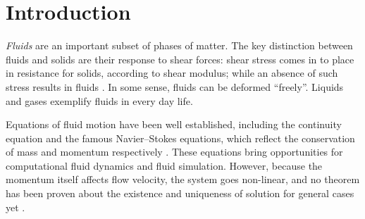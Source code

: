 \documentclass[english, nochinese]{pkupaper}
\title{\titlemark}
\author{\authoring}
\date{June 21, 2018}
\begin{document}
\maketitle

\begin{abstract}
Fluids, highly versatile, have both global structures and time-varying details. This results in difficulties for computation and modeling. In spite of such challenges, \emph{computational fluid dynamics} (CFD) has attracted attention since 20\textsuperscript{th} century, and lots of methodologies have been developed due to the huge number of applications of fluids in engineering. Among different kinds of computational fluid dynamics tasks, \emph{turbulent flows} are of high importance because of its universality and complexity. In order to achieve computational possibility, lots of simplified turbulent models have been proposed. In this report, we investigate and summarize three main types of turbulent models: \emph{direct numerical simulation} (DNS) models, \emph{large eddy simulation} (LES) models and \emph{Reynolds-averaged simulation} (RAS) models. The numerical experiments of these models on several cases have been done on our own, together with detailed analysis, and comparison among these experiments presents different properties of models. We show that these three kinds of models enjoy different precision and efficiency, and therefore fit in different cases. Additionally, we present a novel idea about turbulent flow modeling. The project is held on \url{https://github.com/pppppass/TurbulentFlow}, and \verb"Report.pdf" is placed in the folder \verb"Report" as the digital version.
\end{abstract}

\section{Introduction} \label{Sec:Intro}

\emph{Fluids} are an important subset of phases of matter. The key distinction between fluids and solids are their response to shear forces: shear stress comes in to place in resistance for solids, according to shear modulus; while an absence of such stress results in fluids \parencite{ferziger_computational_2002}.  In some sense, fluids can be deformed ``freely''. Liquids and gases exemplify fluids in every day life.

Equations of fluid motion have been well established, including the continuity equation and the famous Navier--Stokes equations, which reflect the conservation of mass and momentum respectively \parencite{landau_fluid_1987} \parencite{white_fluid_2017}. These equations bring opportunities for computational fluid dynamics and fluid simulation. However, because the momentum itself affects flow velocity, the system goes non-linear, and no theorem has been proven about the existence and uniqueness of solution for general cases yet \parencite{zhaoshun_zhang_theory_2005}.
\end{document}
